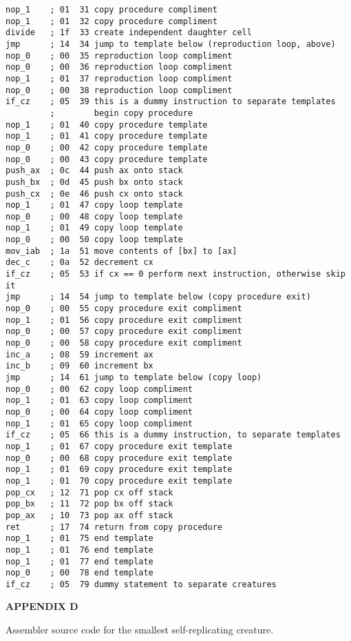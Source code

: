 \begin{verbatim}
nop_1    ; 01  31 copy procedure compliment
nop_1    ; 01  32 copy procedure compliment
divide   ; 1f  33 create independent daughter cell
jmp      ; 14  34 jump to template below (reproduction loop, above)
nop_0    ; 00  35 reproduction loop compliment
nop_0    ; 00  36 reproduction loop compliment
nop_1    ; 01  37 reproduction loop compliment
nop_0    ; 00  38 reproduction loop compliment
if_cz    ; 05  39 this is a dummy instruction to separate templates
         ;        begin copy procedure
nop_1    ; 01  40 copy procedure template
nop_1    ; 01  41 copy procedure template
nop_0    ; 00  42 copy procedure template
nop_0    ; 00  43 copy procedure template
push_ax  ; 0c  44 push ax onto stack
push_bx  ; 0d  45 push bx onto stack
push_cx  ; 0e  46 push cx onto stack
nop_1    ; 01  47 copy loop template
nop_0    ; 00  48 copy loop template
nop_1    ; 01  49 copy loop template
nop_0    ; 00  50 copy loop template
mov_iab  ; 1a  51 move contents of [bx] to [ax]
dec_c    ; 0a  52 decrement cx
if_cz    ; 05  53 if cx == 0 perform next instruction, otherwise skip it
jmp      ; 14  54 jump to template below (copy procedure exit)
nop_0    ; 00  55 copy procedure exit compliment
nop_1    ; 01  56 copy procedure exit compliment
nop_0    ; 00  57 copy procedure exit compliment
nop_0    ; 00  58 copy procedure exit compliment
inc_a    ; 08  59 increment ax
inc_b    ; 09  60 increment bx
jmp      ; 14  61 jump to template below (copy loop)
nop_0    ; 00  62 copy loop compliment
nop_1    ; 01  63 copy loop compliment
nop_0    ; 00  64 copy loop compliment
nop_1    ; 01  65 copy loop compliment
if_cz    ; 05  66 this is a dummy instruction, to separate templates
nop_1    ; 01  67 copy procedure exit template
nop_0    ; 00  68 copy procedure exit template
nop_1    ; 01  69 copy procedure exit template
nop_1    ; 01  70 copy procedure exit template
pop_cx   ; 12  71 pop cx off stack
pop_bx   ; 11  72 pop bx off stack
pop_ax   ; 10  73 pop ax off stack
ret      ; 17  74 return from copy procedure
nop_1    ; 01  75 end template
nop_1    ; 01  76 end template
nop_1    ; 01  77 end template
nop_0    ; 00  78 end template
if_cz    ; 05  79 dummy statement to separate creatures
\end{verbatim}
\newpage
\LP
\bf APPENDIX D\rm
\eLP

Assembler source code for the smallest self-replicating creature.

